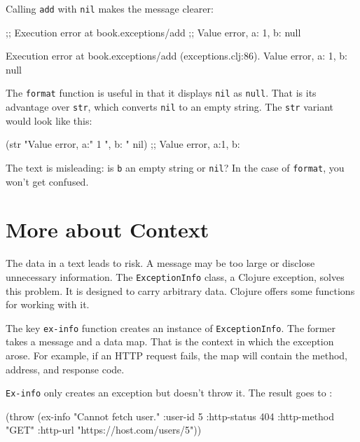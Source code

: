 \fi

\noindent
Calling \verb|add| with \verb|nil| makes the message clearer:

\ifx\DEVICETYPE\MOBILE

\begin{clojure}
;; Execution error at book.exceptions/add
;; Value error, a: 1, b: null
\end{clojure}

\else

\begin{clojure}
Execution error at book.exceptions/add (exceptions.clj:86).
Value error, a: 1, b: null
\end{clojure}

\fi

The \verb|format| function is useful in that it displays \verb|nil| as \verb|null|. That is its advantage over \verb|str|, which converts \verb|nil| to an empty string. The \verb|str| variant would look like this:

\begin{clojure}
(str "Value error, a:" 1 ", b: " nil)
;; Value error, a:1, b:
\end{clojure}

\noindent
The text is misleading: is \verb|b| an empty string or \verb|nil|? In the case of \verb|format|, you won't get confused.

\section{More about Context}


The data in a text leads to risk. A message may be too large or disclose unnecessary information. The \verb|ExceptionInfo| class, a Clojure exception, solves this problem. It is designed to carry arbitrary data. Clojure offers some functions for working with it.

The key \verb|ex-info| function creates an instance of \verb|ExceptionInfo|. The former takes a message and a data map. That is the context in which the exception arose. For example, if an HTTP request fails, the map will contain the method, address, and response code.

\verb|Ex-info| only creates an exception but doesn't throw it. The result goes to :

\ifnarrow

\begin{clojure}
(throw (ex-info
        "Cannot fetch user."
        {:user-id 5
         :http-status 404
         :http-method "GET"
         :http-url
         "https://host.com/users/5"}))
\end{clojure}

